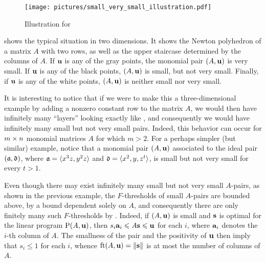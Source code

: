 \documentclass{amsart}
\begin{document}
\begin{example}
   \label{ex: small vs very small}
   \begin{figure}
      \centering
      \texttt{[image: pictures/small\_very\_small\_illustration.pdf]}
      \caption{Illustration for }
      \label{fig: small vs very small}
   \end{figure}
    shows the typical situation in two dimensions.
   It shows the Newton polyhedron of a matrix $A$ with two rows, as well as the upper staircase determined by the columns of $A$.
   If $\mathbf{u}$ is any of the gray points, the monomial pair $(A,\mathbf{u})$ is very small.
   If $\mathbf{u}$ is any of the black points, $(A,\mathbf{u})$ is small, but not very small.
   Finally, if $\mathbf{u}$ is any of the white points, $(A,\mathbf{u})$ is neither small nor very small.

   It is interesting to notice that if we were to make this a three-dimensional example by adding a nonzero constant row to the matrix $A$, we would then have infinitely many ``layers'' looking exactly like , and consequently we would have infinitely many small but not very small pairs.
   Indeed, this behavior can occur for $m \times n$ monomial matrices $A$ for which $m > 2$.
   For a perhaps simpler (but similar) example, notice that a monomial pair $(A, \mathbf{u})$ associated to the ideal pair $(\mathfrak{a}, \mathfrak{d})$, where $\mathfrak{a}= \langle x^3 z, y^2z \rangle$ and $\mathfrak{d} = \langle x^2, y, z^t \rangle$, is small but not very small for every $t > 1$.
\end{example}

\begin{remark}
   \label{rem: finitely many F-thresholds of small pairs}
   Even though there may exist infinitely many small but not very small $A$-pairs, as shown in the previous example, the $F$-thresholds of small $A$-pairs are bounded above, by a bound dependent solely on $A$, and consequently there are only finitely many such $F$-thresholds by .
   Indeed, if $(A,\mathbf{u})$ is small and $\mathbf{s}$ is optimal for the linear program $\mathrm{P}(A,\mathbf{u})$, then $s_i\mathbf{a}_i \leqslant A\mathbf{s} \leqslant \mathbf{u}$ for each $i$, where $\mathbf{a}_i$ denotes the $i$-th column of $A$.
   The smallness of the pair and the positivity of $\mathbf{u}$ then imply that $s_i \le 1$ for each $i$, whence $\operatorname{ft}(A, \mathbf{u}) = \| \mathbf{s} \|$ is at most the number of columns of $A$. 
\end{remark}
\end{document}

